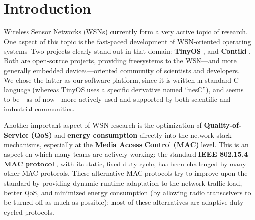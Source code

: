 \documentclass[12pt,twoside,a4paper]{article}
\begin{document}
\newcommand{\term}[1]{\textbf{#1}}

\makeRR



\section{Introduction}

Wireless Sensor Networks (WSNs) currently form a very active topic of
research. One aspect of this topic is the fast-paced development of
WSN-oriented operating systems.
Two projects clearly stand out in that domain: \term{TinyOS} \cite{tiny-os},
and \term{Contiki} \cite{contiki}. Both are open-source projects, providing
free\footnotemark[1] systems to the WSN---and more generally embedded
devices---oriented community of scientists and developers. We chose the
latter as our software platform, since it is written in standard C language
(whereas TinyOS uses a specific derivative named ``nesC''), and seems to
be---as of now---more actively used and supported by both scientific
and industrial communities.


\medskip

Another important aspect of WSN research is the optimization of
\term{Quality-of-Service (QoS)} and \term{energy consumption} directly into
the network stack mechanisms, especially at the \term{Media Access Control
(MAC)} level. This is an aspect on which many teams are actively working:
the standard \term{IEEE 802.15.4 MAC protocol} \cite{std802154}, with its
static, fixed duty-cycle, has been challenged by many other MAC protocols.
These alternative MAC protocols try to improve upon the standard by providing
dynamic runtime adaptation to the network traffic load, better QoS, and
minimized energy consumption (by allowing radio transceivers to be turned
off as much as possible); most of these alternatives are adaptive
duty-cycled protocols.

\medskip
\end{document}
